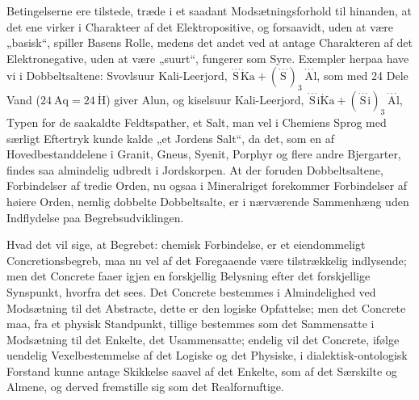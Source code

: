 \documentclass[12pt,a4paper]{book}
\begin{document}
Betingelserne ere tilstede, træde i et saadant Modsætningsforhold
til hinanden, at det ene virker i Charakteer af det
Elektropositive, og forsaavidt, uden at være „basisk“, spiller
Basens Rolle, medens det andet ved at antage Charakteren
af det Elektronegative, uden at være „suurt“, fungerer som
Syre. Exempler herpaa have vi i Dobbeltsaltene: Svovlsuur
Kali-Leerjord,
$\stackrel{\cdot\cdot\cdot}{\mathrm{S}}\dot{\mathrm{K}}\mathrm{a} +
(\stackrel{\cdot\cdot\cdot}{\mathrm{S}})_3\,\stackrel{\cdot\cdot\cdot}{\mathrm{A}}\mathrm{l}$,
som med 24 Dele Vand
($24\ \mathrm{Aq} = 24\ \dot{\mathrm{H}}$) giver Alun, og kiselsuur
Kali-Leerjord,
$\stackrel{\cdot\cdot\cdot}{\mathrm{S}}\mathrm{i}\dot{\mathrm{K}}\mathrm{a} +
(\stackrel{\cdot\cdot\cdot}{\mathrm{S}}\mathrm{i})_3\,\stackrel{\cdot\cdot\cdot}{\mathrm{A}}\mathrm{l}$,
Typen for de saakaldte Feldtspather, et
Salt, man vel i Chemiens Sprog med særligt Eftertryk
kunde kalde „et Jordens Salt“, da det, som en af Hovedbestanddelene
i Granit, Gneus, Syenit, Porphyr og flere
andre Bjergarter, findes saa almindelig udbredt i Jordskorpen.
At der foruden Dobbeltsaltene, Forbindelser af tredie Orden,
nu ogsaa i Mineralriget forekommer Forbindelser af høiere
Orden, nemlig dobbelte Dobbeltsalte, er i nærværende Sammenhæng
uden Indflydelse paa Begrebsudviklingen.

Hvad det vil sige, at Begrebet: chemisk Forbindelse, er
et eiendommeligt Concretionsbegreb, maa nu vel af det Foregaaende
være tilstrækkelig indlysende; men det Concrete faaer
igjen en forskjellig Belysning efter det forskjellige Synspunkt,
hvorfra det sees. Det Concrete bestemmes i Almindelighed
ved Modsætning til det Abstracte, dette er den logiske Opfattelse;
men det Concrete maa, fra et physisk Standpunkt,
tillige bestemmes som det Sammensatte i Modsætning til det
Enkelte, det Usammensatte; endelig vil det Concrete, ifølge
uendelig Vexelbestemmelse af det Logiske og det Physiske, i
dialektisk-ontologisk Forstand kunne antage Skikkelse saavel af
det Enkelte, som af det Særskilte og Almene, og derved fremstille
sig som det Realfornuftige.
\end{document}
